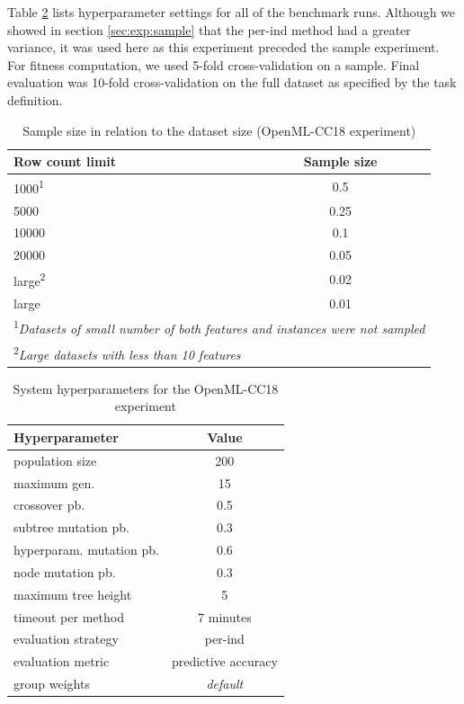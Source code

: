 Table \ref{tab04:exp3:setting} lists hyperparameter settings for all of the
benchmark runs. Although we showed in section \ref{sec:exp:sample}
that the per-ind method had a greater variance, it was used here as this
experiment preceded the sample experiment. For fitness computation, we used
5-fold cross-validation on a sample. Final evaluation was 10-fold
cross-validation on the full dataset as specified by the task definition.

\begin{table}[h]

\centering
\caption{Sample size in relation to the dataset size (OpenML-CC18 experiment)}\label{tab04:exp3:size}
\begin{tabular}{l c}
\toprule
\textbf{Row count limit} & \textbf{Sample size} \\
\midrule
1000\textsuperscript{1} & 0.5 \\
5000 & 0.25 \\
10000 & 0.1 \\
20000 & 0.05 \\
large\textsuperscript{2} & 0.02 \\
large & 0.01 \\
\bottomrule

\multicolumn{2}{l}{\footnotesize
\textsuperscript{1}\textit{Datasets of small number of both features and
instances were not sampled}} \\
\multicolumn{2}{l}{\footnotesize
\textsuperscript{2}\textit{Large datasets with less than 10 features}} 

\end{tabular}

\end{table}

\begin{table}[h]

\centering
\caption{System hyperparameters for the OpenML-CC18 experiment}\label{tab04:exp3:setting}
\begin{tabular}{l c}
\toprule
\textbf{\upshape Hyperparameter} & \textbf{Value} \\
\midrule
population size & 200 \\
maximum gen. & 15 \\
crossover pb. & 0.5 \\
subtree mutation pb. & 0.3 \\
hyperparam. mutation pb. & 0.6 \\
node mutation pb. & 0.3 \\
maximum tree height & 5 \\
timeout per method  & 7 minutes \\
evaluation strategy & per-ind \\
evaluation metric & predictive accuracy \\
group weights & \textit{default} \\
\bottomrule

\end{tabular}

\end{table}

